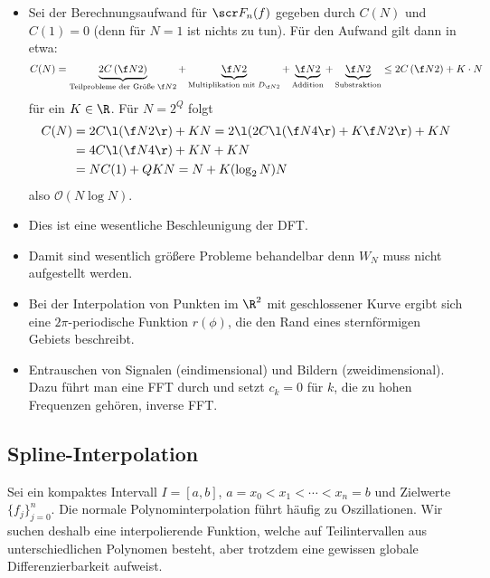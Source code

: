 \documentclass[a4paper,11pt]{scrartcl}
\begin{document}
\begin{nt*}[Aufwandsbetrachtung]
		\begin{itemize}
			\item
				Sei der Berechnungsaufwand für $\scr F_n(f)$ gegeben durch $C(N)$ und $C(1)=0$ (denn für $N=1$ ist nichts zu tun).
				Für den Aufwand gilt dann in etwa:
				\[
					C(N) = \underbrace{2C\left(\f N2\right)}_{\text{Teilprobleme der Größe $\f N2$}} + \underbrace{\f N2}_{\text{Multiplikation mit $D_{\f N2}$}} + \underbrace{\f N2}_{\text{Addition}} + \underbrace{\f N2}_{\text{Substraktion}} \le 2 C\left(\f N2\right) + K\cdot N
				\]
				für ein $K\in \R$.
				Für $N=2^Q$ folgt
				\begin{align*}
					C(N) &= 2C\l(\f N2\r) + KN = 2\l(2C\l(\f N4\r) + K\f N2\r) + KN \\
					&= 4C\l(\f N4\r) + KN + KN \\
					&= NC(1) + QKN = N + K(\log_2 N)N 
				\end{align*}
				also $\mathcal O(N\log N)$.
			\item
				Dies ist eine wesentliche Beschleunigung der DFT.
			\item
				Damit sind wesentlich größere Probleme behandelbar denn $W_N$ muss nicht aufgestellt werden.
		\end{itemize}
\end{nt*}

\begin{nt*}
	\begin{itemize}
		\item
			Bei der Interpolation von Punkten im $\R^2$ mit geschlossener Kurve ergibt sich eine $2\pi$-periodische Funktion $r(\phi)$, die den Rand eines sternförmigen Gebiets beschreibt.
		\item
			Entrauschen von Signalen (eindimensional) und Bildern (zweidimensional).
			Dazu führt man eine FFT durch und setzt $c_k= 0$ für $k$, die zu hohen Frequenzen gehören, inverse FFT.
	\end{itemize}
\end{nt*}


\subsection{Spline-Interpolation}


Sei ein kompaktes Intervall $I=[a,b]$, $a=x_0<x_1 < \dotsb < x_n = b$ und Zielwerte $\{f_j\}_{j=0}^n$.
Die normale Polynominterpolation führt häufig zu Oszillationen.
Wir suchen deshalb eine interpolierende Funktion, welche auf Teilintervallen aus unterschiedlichen Polynomen besteht, aber trotzdem eine gewissen globale Differenzierbarkeit aufweist.
\end{document}
